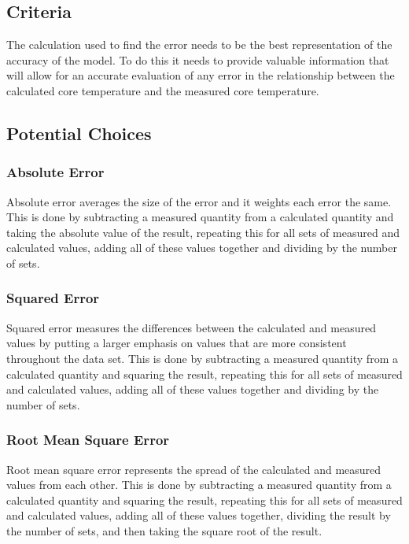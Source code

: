 \documentclass[onecolumn, draftclsnofoot,10pt, compsoc]{IEEEtran}
\begin{document}
		\subsection{Criteria}
		
		The calculation used to find the error needs to be the best representation of the accuracy of the model. To do this it needs to provide valuable information that will allow for an accurate evaluation of any error in the relationship between the calculated core temperature and the measured core temperature. 
		
	
		\subsection{Potential Choices}

		\subsubsection{Absolute Error}
		
		Absolute error averages the size of the error and it weights each error the same. This is done by subtracting a measured quantity from a calculated quantity and taking the absolute value of the result, repeating this for all sets of measured and calculated values, adding all of these values together and dividing by the number of sets.\cite{AbsSqr}  

		\subsubsection{Squared Error}
		
		Squared error measures the differences between the calculated and measured values by putting a larger emphasis on values that are more consistent throughout the data set. This is done by subtracting a measured quantity from a calculated quantity and squaring the result, repeating this for all sets of measured and calculated values, adding all of these values together and dividing by the number of sets.\cite{AbsSqr} 

		\subsubsection{Root Mean Square Error}
		
		Root mean square error represents the spread of the calculated and measured values from each other. This is done by subtracting a measured quantity from a calculated quantity and squaring the result, repeating this for all sets of measured and calculated values, adding all of these values together, dividing the result by the number of sets, and then taking the square root of the result.\cite{Root}\cite{RootAbs} 
\end{document}
